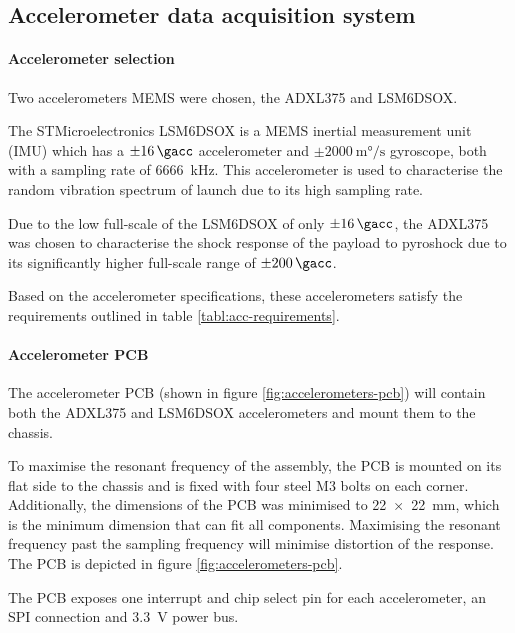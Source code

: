 \documentclass{report}
\begin{document}
\subsection{Accelerometer data acquisition system}
\paragraph{Accelerometer selection}

Two accelerometers MEMS were chosen, the ADXL375 and LSM6DSOX.

The STMicroelectronics LSM6DSOX is a MEMS inertial measurement unit (IMU) which has a $\pm\SI{16}{\gacc}$ accelerometer and $\pm\SI{2000}{\milli\degree\per\second}$ gyroscope, both with a sampling rate of \SI{6666}{\kilo\hertz}. This accelerometer is used to characterise the random vibration spectrum of launch due to its high sampling rate.

Due to the low full-scale of the LSM6DSOX of only $\pm\SI{16}{\gacc}$, the ADXL375 was chosen to characterise the shock response of the payload to pyroshock due to its significantly higher full-scale range of $\pm\SI{200}{\gacc}$.

Based on the accelerometer specifications, these accelerometers satisfy the requirements outlined in table \ref{tabl:acc-requirements}.

\paragraph{Accelerometer PCB}

The accelerometer PCB (shown in figure \ref{fig:accelerometers-pcb}) will contain both the ADXL375 and LSM6DSOX accelerometers and mount them to the chassis.

To maximise the resonant frequency of the assembly, the PCB is mounted on its flat side to the chassis and is fixed with four steel M3 bolts on each corner. Additionally, the dimensions of the PCB was minimised to \SI{22x22}{\milli\metre}, which is the minimum dimension that can fit all components. Maximising the resonant frequency past the sampling frequency will minimise distortion of the response. The PCB is depicted in figure \ref{fig:accelerometers-pcb}.

The PCB exposes one interrupt and chip select pin for each accelerometer, an SPI connection and \SI{3.3}{\volt} power bus.
\end{document}
